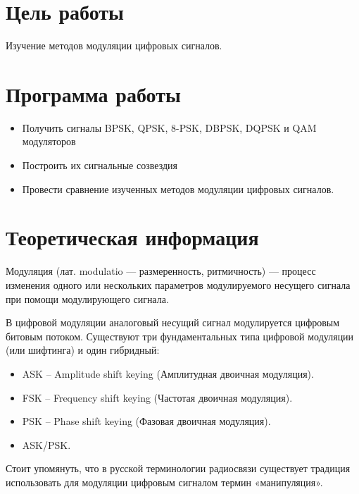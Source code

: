 
\usepackage{minted}

	
	
	
	\setcounter{page}{2}
	
	
	
	\section{Цель работы}
	Изучение методов модуляции цифровых сигналов.
	
	\section{Программа работы}
	\begin{itemize}
		\item Получить сигналы BPSK, QPSK, 8-PSK, DBPSK, DQPSK и QAM модуляторов
		\item Построить их сигнальные созвездия
		\item Провести сравнение изученных методов модуляции цифровых сигналов.
	\end{itemize}
	
	\section{Теоретическая информация}
	Модуляция (лат. modulatio — размеренность, ритмичность) — процесс изменения одного или нескольких параметров модулируемого несущего сигнала при помощи модулирующего сигнала.
	
	В цифровой модуляции аналоговый несущий сигнал модулируется цифровым битовым потоком.
	Существуют три фундаментальных типа цифровой модуляции (или шифтинга) и один гибридный:
	\begin{itemize}
		\item ASK – Amplitude shift keying (Амплитудная двоичная модуляция).
		\item FSK – Frequency shift keying (Частотая двоичная модуляция).
		\item PSK – Phase shift keying (Фазовая двоичная модуляция).
		\item ASK/PSK.
	\end{itemize}
	
	Стоит упомянуть, что в русской терминологии радиосвязи существует традиция использовать для модуляции цифровым сигналом термин «манипуляция».
	
